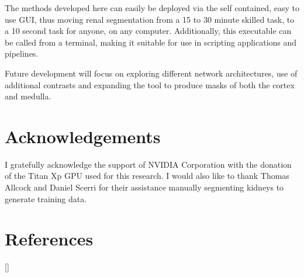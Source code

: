 The methods developed here can easily be deployed via the self contained, easy to use \ac{GUI}, thus moving renal segmentation from a 15 to 30 minute skilled task, to a 10 second task for anyone, on any computer. Additionally, this executable can be called from a terminal, making it suitable for use in scripting applications and pipelines.

Future development will focus on exploring different network architectures, use of additional contrasts and expanding the tool to produce masks of both the cortex and medulla.

\section{Acknowledgements}

I gratefully acknowledge the support of NVIDIA Corporation with the donation of the Titan Xp GPU used for this research. I would also like to thank Thomas Allcock and Daniel Scerri for their assistance manually segmenting kidneys to generate training data.

\newpage
\section{References}
[\refname]{}
\printbibliography